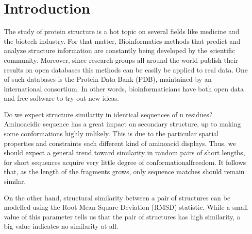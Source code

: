 \documentclass[a4paper, 11pt]{article} %
\begin{document}
\newpage

\setcounter{figure}{0}
\renewcommand\thefigure{\arabic{figure}}
%
\setcounter{table}{0}
\renewcommand\thetable{\arabic{table}}

\thispagestyle{empty}
\tableofcontents
\thispagestyle{empty}

\newpage




\setcounter{page}{1}
\section{Introduction}

The study of protein structure is a hot topic on several fields like medicine and the biotech industry. For that matter, Bioinformatics methods that predict and analyze structure information are constantly being developed by the scientific community. Moreover, since research groups all around the world publish their results on open databases this methods can be easily be applied to real data. One of such databases is the Protein Data Bank (PDB), maintained by an international consortium. In other words, bioinformaticians have both open data and free software to try out new ideas.

Do we expect structure similarity in identical sequences of n residues? Aminoacidic sequence has a great impact on secondary structure, up to making some conformations highly unlikely. This is due to the particular spatial properties and constraints each different kind of aminoacid displays. Thus, we should expect a general trend toward similarity in random pairs of short lengths, for short sequences acquire very little degree of \textquotesingle conformational\textquotesingle freedom. It follows that, as the length of the fragments grows, only sequence matches should remain similar.

On the other hand, structural similarity between a pair of structures can be modelled using the Root Mean Square Deviation (RMSD) statistic. While a small value of this parameter tells us that the pair of structures has high similarity, a big value indicates no similarity at all.
\end{document}

